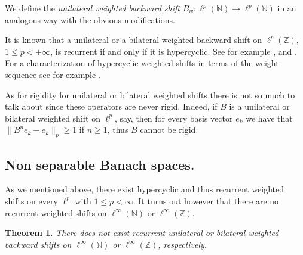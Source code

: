 \documentclass[12pt,leqno]{amsart}
\theoremstyle{plain}
\newtheorem{theorem}[equation]{Theorem}
\theoremstyle{definition}
\numberwithin{equation}{section}
\begin{document}
We define the \emph{unilateral weighted backward shift} $B_w:\ell^p(\mathbb N)\to \ell^p(\mathbb N)$ in an analogous way with the obvious modifications.

It is known that a unilateral or a bilateral weighted backward shift on $\ell ^p (\mathbb Z)$, $1\leq p<+\infty$, is recurrent if and only if it is hypercyclic. See for example \cite{ChSe},\cite{Sece:thesis} and \cite{CP}. For a characterization of hypercyclic weighted shifts in terms of the weight sequence see for example \cite{Salas}.

As for rigidity for unilateral or bilateral weighted shifts there is not so much to talk about since these operators are never rigid. Indeed, if $B$ is a unilateral or bilateral weighted shift on $\ell^p$, say, then for every basis vector $e_k$ we have that $\|B^n e_k-e_k\|_p\geq 1$ if $n\geq 1$, thus $B$ cannot be rigid.
\subsection{Non separable Banach spaces.} As we mentioned above, there exist hypercyclic and thus recurrent weighted shifts on every $\ell^p$ with $1\leq p<\infty$. It turns out however that there are no recurrent weighted shifts on $\ell^\infty(\mathbb N)$ or $\ell^\infty(\mathbb Z)$. 

\begin{theorem}
	There does not exist recurrent unilateral or bilateral weighted backward shifts on $\ell^{\infty}(\mathbb{N})$ or $\ell^\infty(\mathbb Z)$, respectively. 
\end{theorem}
\end{document}
